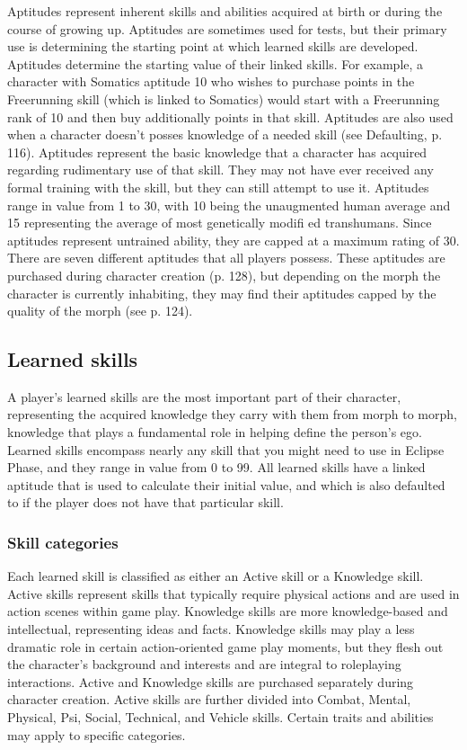 Aptitudes represent inherent skills and abilities acquired at birth or during the course of growing up. Aptitudes are sometimes used for tests, but their primary use is determining the starting point at which learned skills are developed. Aptitudes determine the starting value of their linked skills. For example, a character with Somatics aptitude 10 who wishes to purchase points in the Freerunning skill (which is linked to Somatics) would start with a Freerunning rank of 10 and then buy additionally points in that skill. Aptitudes are also used when a character doesn’t posses knowledge of a needed skill (see Defaulting, p.
116). Aptitudes represent the basic knowledge that a character has acquired regarding rudimentary use of that skill. They may not have ever received any formal training with the skill, but they can still attempt to use it. Aptitudes range in value from 1 to 30, with 10 being the unaugmented human average and 15 representing the average of most genetically modifi ed transhumans. Since aptitudes represent untrained ability, they are capped at a maximum rating of 30. There are seven different aptitudes that all players possess. These aptitudes are purchased during character creation (p. 128), but depending on the morph the character is currently inhabiting, they may find their aptitudes capped by the quality of the morph (see p. 124).


\subsection{Learned skills}
\label{sec:learnedskills}

A player’s learned skills are the most important part of their character, representing the acquired knowledge they carry with them from morph to morph, knowledge that plays a fundamental role in helping define the person’s ego. Learned skills encompass nearly any skill that you might need to use in Eclipse Phase, and they range in value from 0 to 99. All learned skills have a linked aptitude that is used to calculate their initial value, and which is also defaulted to if the player does not have that particular skill.


\subsubsection{Skill categories}
\label{sec:skillcategories}

Each learned skill is classified as either an Active skill or a Knowledge skill. Active skills represent skills that typically require physical actions and are used in action scenes within game play. Knowledge skills are more knowledge-based and intellectual, representing ideas and facts. Knowledge skills may play a less dramatic role in certain action-oriented game play moments, but they flesh out the character’s background and interests and are integral to roleplaying interactions. Active and Knowledge skills are purchased separately during character creation. Active skills are further divided into Combat, Mental, Physical, Psi, Social, Technical, and Vehicle skills. Certain traits and abilities may apply to specific categories.


